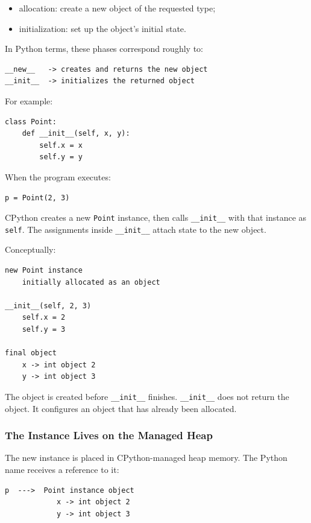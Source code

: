 \begin{itemize}
    \item allocation: create a new object of the requested type;
    \item initialization: set up the object's initial state.
\end{itemize}

In Python terms, these phases correspond roughly to:

\begin{verbatim}
__new__   -> creates and returns the new object
__init__  -> initializes the returned object
\end{verbatim}

For example:

\begin{verbatim}
class Point:
    def __init__(self, x, y):
        self.x = x
        self.y = y
\end{verbatim}

When the program executes:

\begin{verbatim}
p = Point(2, 3)
\end{verbatim}

CPython creates a new \texttt{Point} instance, then calls \texttt{\_\_init\_\_} with that instance as \texttt{self}. The assignments inside \texttt{\_\_init\_\_} attach state to the new object.

Conceptually:

\begin{verbatim}
new Point instance
    initially allocated as an object

__init__(self, 2, 3)
    self.x = 2
    self.y = 3

final object
    x -> int object 2
    y -> int object 3
\end{verbatim}

The object is created before \texttt{\_\_init\_\_} finishes. \texttt{\_\_init\_\_} does not return the object. It configures an object that has already been allocated.

\subsubsection*{The Instance Lives on the Managed Heap}

The new instance is placed in CPython-managed heap memory. The Python name receives a reference to it:

\begin{verbatim}
p  --->  Point instance object
            x -> int object 2
            y -> int object 3
\end{verbatim}

